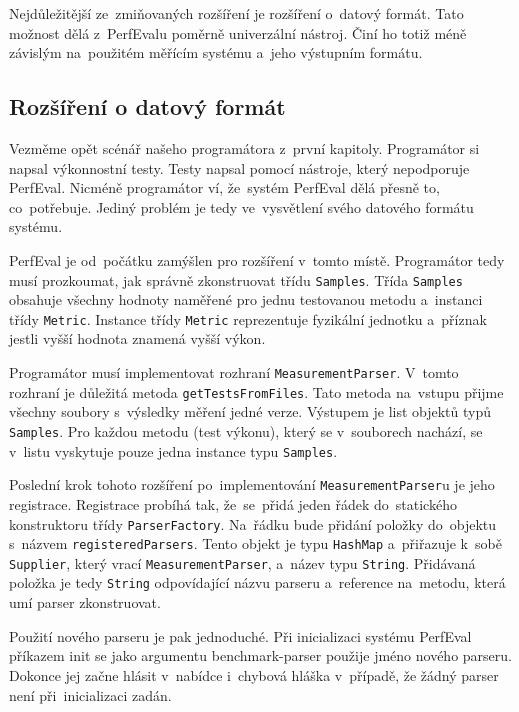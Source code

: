 Nejdůležitější ze~zmiňovaných rozšíření je rozšíření o~datový formát. Tato možnost dělá z~PerfEvalu
poměrně univerzální nástroj. Činí ho totiž méně závislým na~použitém měřícím systému a~jeho výstupním formátu.

\subsection{Rozšíření o datový formát}

Vezměme opět scénář našeho programátora z~první kapitoly. Programátor si napsal výkonnostní testy.
Testy napsal pomocí nástroje, který nepodporuje PerfEval. Nicméně programátor ví, že~systém PerfEval
dělá přesně to, co~potřebuje. Jediný problém je tedy ve~vysvětlení svého datového formátu systému.

PerfEval je od~počátku zamýšlen pro rozšíření v~tomto místě. Programátor tedy musí prozkoumat, jak správně zkonstruovat
třídu \lstinline{Samples}. Třída \lstinline{Samples} obsahuje všechny hodnoty naměřené pro jednu testovanou metodu a~instanci
třídy \lstinline{Metric}. Instance třídy \lstinline{Metric} reprezentuje fyzikální jednotku a~příznak jestli vyšší hodnota
znamená vyšší výkon.

Programátor musí implementovat rozhraní \lstinline{MeasurementParser}. V~tomto rozhraní je důležitá metoda
\lstinline{getTestsFromFiles}. Tato metoda na~vstupu přijme všechny soubory s~výsledky měření jedné verze. Výstupem je list objektů
typů \lstinline{Samples}. Pro každou metodu (test výkonu), který se v~souborech nachází, se v~listu vyskytuje pouze jedna instance
typu \lstinline{Samples}.

Poslední krok tohoto rozšíření po~implementování \lstinline{MeasurementParser}u je jeho registrace. Registrace probíhá tak,
že~se~přidá jeden řádek do~statického konstruktoru třídy \lstinline{ParserFactory}. Na~řádku bude přidání položky do~objektu
s~názvem \lstinline{registeredParsers}. Tento objekt je typu \lstinline{HashMap} a~přiřazuje k~sobě \lstinline{Supplier}, který vrací \lstinline{MeasurementParser},
a~název typu \lstinline{String}. Přidávaná položka je tedy \lstinline{String} odpovídající názvu parseru a~reference na~metodu,
která umí parser zkonstruovat.

Použití nového parseru je pak jednoduché. Při inicializaci systému PerfEval příkazem init se jako argumentu
benchmark-parser použije jméno nového parseru. Dokonce jej začne hlásit v~nabídce i~chybová hláška v~případě, že žádný parser
není při~inicializaci zadán.

